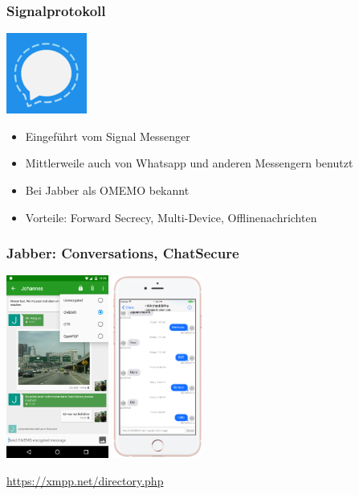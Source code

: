 \begin{frame}
  \frametitle{Signalprotokoll}
  \begin{center}
    \includegraphics[height=0.2\textheight]{../../img/signal-logo.png}
  \end{center}
  \begin{itemize}
    \item<2->Eingeführt vom Signal Messenger
    \item<3->Mittlerweile auch von Whatsapp und anderen Messengern benutzt
    \item<4->Bei Jabber als OMEMO bekannt
    \item<5->Vorteile: Forward Secrecy, Multi-Device, Offlinenachrichten
  \end{itemize}
\end{frame}

\begin{frame}
  \frametitle{Jabber: Conversations, ChatSecure}
    \begin{center}
      \includegraphics[height=6cm]{../../img/conversations.jpg}
      \hspace{0.5cm}
      \includegraphics[height=6cm]{../../img/chatsecure.png}
    \end{center}
    \url{https://xmpp.net/directory.php}
\end{frame}


